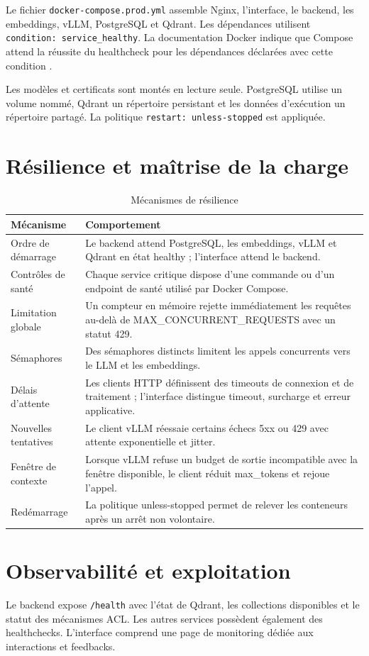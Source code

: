 Le fichier \texttt{docker-compose.prod.yml} assemble Nginx, l'interface, le backend, les embeddings, vLLM, PostgreSQL et Qdrant. Les dépendances utilisent \texttt{condition: service\_healthy}. La documentation Docker indique que Compose attend la réussite du healthcheck pour les dépendances déclarées avec cette condition \citep{DockerComposeDocs2026}.

Les modèles et certificats sont montés en lecture seule. PostgreSQL utilise un volume nommé, Qdrant un répertoire persistant et les données d'exécution un répertoire partagé. La politique \texttt{restart: unless-stopped} est appliquée.

\section{Résilience et maîtrise de la charge}

\begin{table}[H]
\centering
\caption{Mécanismes de résilience}
\label{tab:resilience_ch5}
\begin{tabular}{p{3.5cm}p{9.8cm}}
\toprule
\textbf{Mécanisme} & \textbf{Comportement} \\
\midrule
Ordre de démarrage & Le backend attend PostgreSQL, les embeddings, vLLM et Qdrant en état healthy ; l’interface attend le backend. \\
Contrôles de santé & Chaque service critique dispose d’une commande ou d’un endpoint de santé utilisé par Docker Compose. \\
Limitation globale & Un compteur en mémoire rejette immédiatement les requêtes au-delà de MAX\_CONCURRENT\_REQUESTS avec un statut 429. \\
Sémaphores & Des sémaphores distincts limitent les appels concurrents vers le LLM et les embeddings. \\
Délais d’attente & Les clients HTTP définissent des timeouts de connexion et de traitement ; l’interface distingue timeout, surcharge et erreur applicative. \\
Nouvelles tentatives & Le client vLLM réessaie certains échecs 5xx ou 429 avec attente exponentielle et jitter. \\
Fenêtre de contexte & Lorsque vLLM refuse un budget de sortie incompatible avec la fenêtre disponible, le client réduit max\_tokens et rejoue l’appel. \\
Redémarrage & La politique unless-stopped permet de relever les conteneurs après un arrêt non volontaire. \\
\bottomrule
\end{tabular}
\end{table}

\section{Observabilité et exploitation}

Le backend expose \texttt{/health} avec l'état de Qdrant, les collections disponibles et le statut des mécanismes ACL. Les autres services possèdent également des healthchecks. L'interface comprend une page de monitoring dédiée aux interactions et feedbacks.
